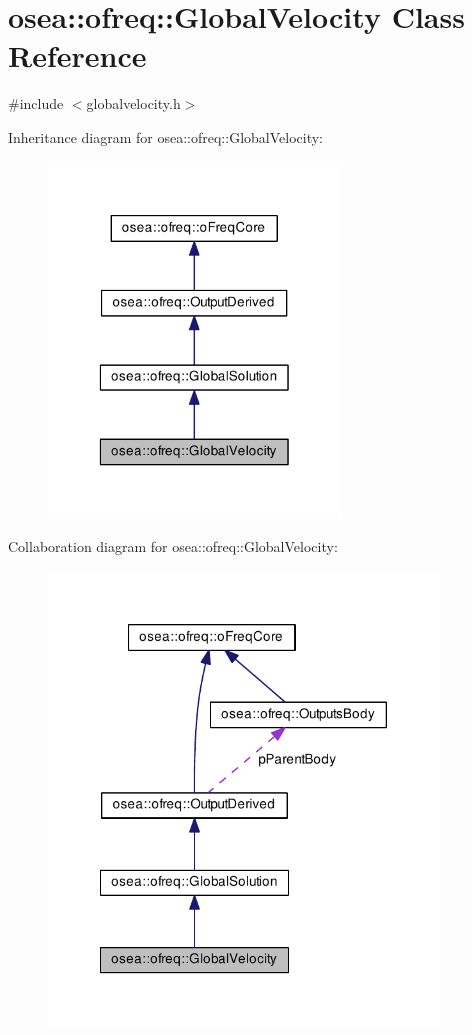 \hypertarget{classosea_1_1ofreq_1_1_global_velocity}{\section{osea\-:\-:ofreq\-:\-:Global\-Velocity Class Reference}
\label{classosea_1_1ofreq_1_1_global_velocity}
}


{\ttfamily \#include $<$globalvelocity.\-h$>$}



Inheritance diagram for osea\-:\-:ofreq\-:\-:Global\-Velocity\-:\nopagebreak
\begin{figure}[H]
\begin{center}
\leavevmode
\includegraphics[width=220pt]{classosea_1_1ofreq_1_1_global_velocity__inherit__graph}
\end{center}
\end{figure}


Collaboration diagram for osea\-:\-:ofreq\-:\-:Global\-Velocity\-:
\nopagebreak
\begin{figure}[H]
\begin{center}
\leavevmode
\includegraphics[width=294pt]{classosea_1_1ofreq_1_1_global_velocity__coll__graph}
\end{center}
\end{figure}
